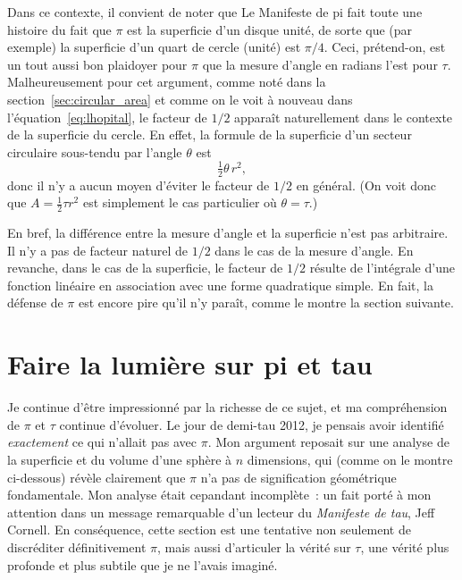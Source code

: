 Dans ce contexte, il convient de noter que Le Manifeste de pi fait toute une
histoire du fait que $\pi$ est la superficie d'un disque unité, de sorte que
(par exemple) la superficie d'un quart de cercle (unité) est $\pi/4$. Ceci,
prétend-on, est un tout aussi bon plaidoyer pour $\pi$ que la mesure d'angle en radians l'est pour
$\tau$. Malheureusement pour cet argument, comme noté dans la
section~\ref{sec:circular_area} et comme on le voit à nouveau dans
l'équation~\eqref{eq:lhopital}, le facteur de $1/2$ apparaît naturellement dans le
contexte de la superficie du cercle. En effet, la formule de la superficie d'un
secteur circulaire sous-tendu par l'angle $\theta$ est
\[
\tfrac{1}{2}\theta\, r^2,
\]
donc il n'y a aucun moyen d'éviter le facteur de $1/2$ en général. (On voit donc
que $A = \frac{1}{2}\tau r^2$ est simplement le cas particulier où $\theta =
\tau$.)

En bref, la différence entre la mesure d'angle et la superficie n'est pas
arbitraire. \linebreak Il n'y a pas de facteur naturel de $1/2$ dans le cas de
la mesure d'angle. En revanche, dans le cas de la superficie, le facteur de $1/2$
résulte de l'intégrale d'une fonction linéaire en association avec une forme
quadratique simple. En fait, la défense de $\pi$ est encore pire qu'il n'y paraît,
comme le montre la section suivante.


\section{Faire la lumière sur pi et tau} %
\label{sec:getting_to_the_bottom_of_pi}

Je continue d'être impressionné par la richesse de ce sujet, et ma compréhension
de $\pi$ et $\tau$ continue d'évoluer. Le jour de demi-tau 2012, je pensais
avoir identifié \emph{exactement} ce qui n'allait pas avec $\pi$. Mon argument
reposait sur une analyse de la superficie et du volume d'une sphère à $n$
dimensions, qui (comme on le montre ci-dessous) révèle clairement que $\pi$ n'a pas
de signification géométrique fondamentale. Mon analyse était cepandant
incomplète~: un fait porté à mon attention dans un message remarquable d'un
lecteur du \emph{Manifeste de tau}, Jeff Cornell. En conséquence, cette section
est une tentative non seulement de discréditer définitivement $\pi$, mais aussi
d'articuler la vérité sur $\tau$, une vérité plus profonde et plus subtile que
je ne l'avais imaginé.

